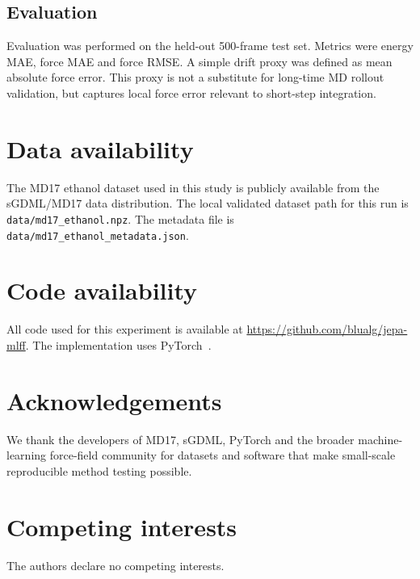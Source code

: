 \documentclass[11pt]{article}
\begin{document}
\subsection*{Evaluation}
Evaluation was performed on the held-out 500-frame test set. Metrics were energy MAE, force MAE and force RMSE. A simple drift proxy was defined as mean absolute force error. This proxy is not a substitute for long-time MD rollout validation, but captures local force error relevant to short-step integration.

\section*{Data availability}
The MD17 ethanol dataset used in this study is publicly available from the sGDML/MD17 data distribution. The local validated dataset path for this run is \texttt{data/md17\_ethanol.npz}. The metadata file is \texttt{data/md17\_ethanol\_metadata.json}.

\section*{Code availability}
All code used for this experiment is available at \url{https://github.com/blualg/jepa-mlff}. The implementation uses PyTorch~\cite{paszke2019pytorch}.

\section*{Acknowledgements}
We thank the developers of MD17, sGDML, PyTorch and the broader machine-learning force-field community for datasets and software that make small-scale reproducible method testing possible.

\section*{Competing interests}
The authors declare no competing interests.



\end{document}
